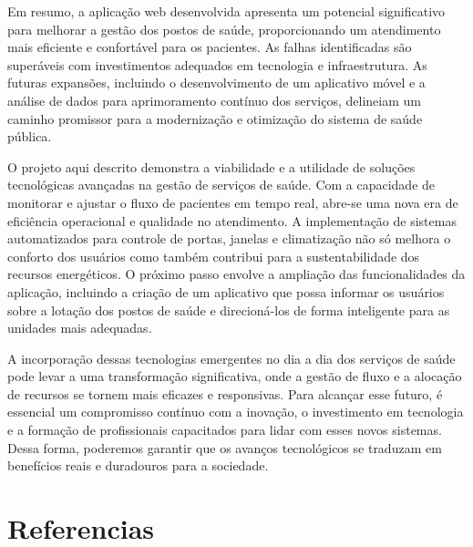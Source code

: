 \documentclass[conference, a4paper, 12pt]{IEEEtran}
\begin{document}
  Em resumo, a aplicação web desenvolvida apresenta um potencial significativo para melhorar a gestão dos postos de saúde, proporcionando um atendimento mais eficiente e confortável para os pacientes. As falhas identificadas são superáveis com investimentos adequados em tecnologia e infraestrutura. As futuras expansões, incluindo o desenvolvimento de um aplicativo móvel e a análise de dados para aprimoramento contínuo dos serviços, delineiam um caminho promissor para a modernização e otimização do sistema de saúde pública.

  O projeto aqui descrito demonstra a viabilidade e a utilidade de soluções tecnológicas avançadas na gestão de serviços de saúde. Com a capacidade de monitorar e ajustar o fluxo de pacientes em tempo real, abre-se uma nova era de eficiência operacional e qualidade no atendimento. A implementação de sistemas automatizados para controle de portas, janelas e climatização não só melhora o conforto dos usuários como também contribui para a sustentabilidade dos recursos energéticos. O próximo passo envolve a ampliação das funcionalidades da aplicação, incluindo a criação de um aplicativo que possa informar os usuários sobre a lotação dos postos de saúde e direcioná-los de forma inteligente para as unidades mais adequadas.

  A incorporação dessas tecnologias emergentes no dia a dia dos serviços de saúde pode levar a uma transformação significativa, onde a gestão de fluxo e a alocação de recursos se tornem mais eficazes e responsivas. Para alcançar esse futuro, é essencial um compromisso contínuo com a inovação, o investimento em tecnologia e a formação de profissionais capacitados para lidar com esses novos sistemas. Dessa forma, poderemos garantir que os avanços tecnológicos se traduzam em benefícios reais e duradouros para a sociedade.






\section{Referencias}
\label{sec:references}


\end{document}

